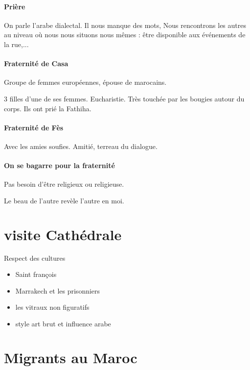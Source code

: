 \paragraph{Prière} On parle l'arabe dialectal. Il nous manque des mots, 
Nous rencontrons les autres au niveau où nous nous situons nous mêmes : être disponible aux événements de la rue,...

\paragraph{Fraternité de Casa} Groupe de femmes européennes, épouse de marocains. 
\begin{Ex}
3 filles d'une de ses femmes. 
Eucharistie. 
Très touchée par les bougies autour du corps.
Ils ont prié la Fathiha. 
\end{Ex}


\paragraph{Fraternité de Fès} Avec les amies soufies. Amitié, terreau du dialogue. 

\paragraph{On se bagarre pour la fraternité} Pas besoin d'être religieux ou religieuse.

Le beau de l'autre revèle l'autre en moi. 


\section{visite Cathédrale}
Respect des cultures
\begin{itemize}
    \item Saint françois 
   \item Marrakech et les prisonniers
   \item  les vitraux non figuratifs
   \item style art brut et influence arabe
\end{itemize}





\section{Migrants au Maroc}


